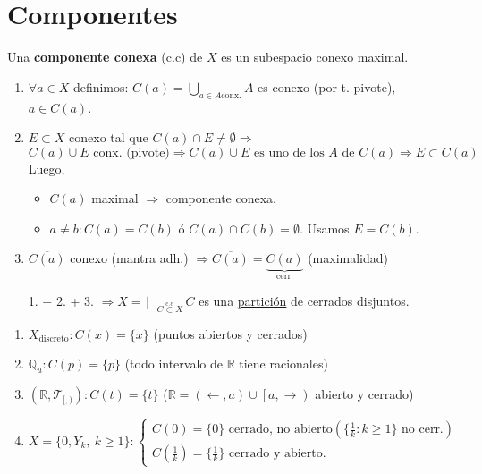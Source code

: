 \section{Componentes}%
\label{sec:componentes}
\begin{defi}
Una \textbf{componente conexa} (c.c) de $X$ es un subespacio conexo maximal.
\end{defi}

\begin{prop}[Construcción]
\begin{enumerate}
    \item $\forall a \in X$ definimos: $C\left( a \right) = \bigcup_{a \in A \text{conx.}} A$ es conexo (por t. pivote), $a \in C\left( a \right)$.
    \item $E \subset X$ conexo tal que $C\left( a \right) \cap E \neq \emptyset \Rightarrow$
    \[
    C\left( a \right) \cup E \text{ conx. (pivote)} \Rightarrow C\left( a \right) \cup E \text{ es uno de los } A \text{ de } C\left( a \right) \Rightarrow E \subset C\left( a \right) 
    \]
    Luego, 
    \begin{itemize}
        \item $C\left( a \right)$ maximal $\Rightarrow$ componente conexa.
        \item $a \neq b: C\left( a \right) = C\left( b \right)$ ó $C\left( a \right) \cap C\left( b \right) = \emptyset$. Usamos $E = C\left( b \right)$.
    \end{itemize}

    \item $\overline{C\left( a \right)}$ conexo (mantra adh.) $\Rightarrow \overline{C\left( a \right)} = \underbrace{C\left( a \right)}_{\text{cerr.}}$ (maximalidad)
    \item[1. + 2. + 3.] $\Rightarrow X = \bigsqcup_{C \stackrel{\text{c.c}}{\subset}  X} C$ es una \underline{partición} de cerrados disjuntos.
\end{enumerate} 
\end{prop}

\begin{ej}
\begin{enumerate}
    \item $X_{\text{discreto}}: C\left( x \right) = \{x\}$ (puntos abiertos y cerrados)
    \item $\mathbb{Q}_u : C\left( p \right) = \{p\}$ (todo intervalo de $\mathbb{R}$ tiene racionales)
    \item $\left( \mathbb{R}, \mathcal{T}_{[, )} \right): C\left( t \right) = \{t\}$ ($\mathbb{R} = \left( \leftarrow, a \right) \cup \left[ a, \rightarrow \right)$ abierto y cerrado)
    \item $X = \{0, Y_k,\ k \ge 1\} : \begin{cases}
        C\left( 0 \right) = \{0\} \text{ cerrado, no abierto} \left( \{\frac{1}{k}: k\ge 1 \}  \text{ no cerr.}\right)\\
        C\left( \frac{1}{k} \right) = \{\frac{1}{k}\} \text{ cerrado y abierto.} 
    \end{cases} $
\end{enumerate}
\end{ej}

